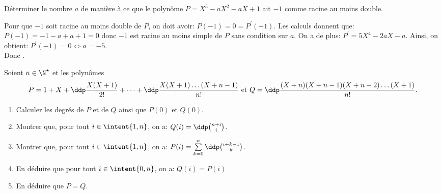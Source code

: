 \documentclass[a4paper, 11pt,reqno]{article}
\begin{document}
\begin{exercice}  \;
	D\'eterminer le nombre $a$ de mani\`ere  \`a ce que le polyn\^ome $P=X^5-aX^2-aX+1$ ait $-1$ comme racine au moins double.
\end{exercice}
\begin{correction}  \;
	Pour que $-1$ soit racine au moins double de $P$, on doit avoir: $P(-1)=0=P^{\prime}(-1)$. Les calculs donnent que: $P(-1)=-1-a+a+1=0$ donc $-1$ est racine au moins simple de $P$ sans condition sur $a$. On a de plus: $P^{\prime}=5X^4-2aX-a$. Ainsi, on obtient: $P^{\prime}(-1)=0\Leftrightarrow a=-5$. \\
	Donc .
\end{correction}
\begin{exercice}
	Soient $n\in\N^{\star}$ et les polyn\^omes
	$$P=1+X+\ddp\frac{X(X+1)}{2!}+\dots+\ddp\frac{X(X+1)\dots (X+n-1)}{n!}\ \hbox{et}\ Q=\ddp\frac{(X+n)(X+n-1)(X+n-2)\dots(X+1)}{n!}.$$
	\begin{enumerate}
		\item Calculer les degr\'es de $P$ et de $Q$ ainsi que $P(0)$ et $Q(0)$.
		\item Montrer que, pour tout $i\in\intent{ 1,n}$, on a: $Q(i)=\ddp \binom{n+i}{i}$.
		\item Montrer que, pour tout $i\in\intent{ 1,n}$, on a: $P(i)=\sum\limits_{k=0}^n \ddp \binom{i+k-1}{k}$.
		\item En d\'eduire que pour tout $i\in\intent{ 0,n}$, on a: $Q(i)=P(i)$
		\item En d\'eduire que $P=Q$.
	\end{enumerate}
\end{exercice}
\end{document}
